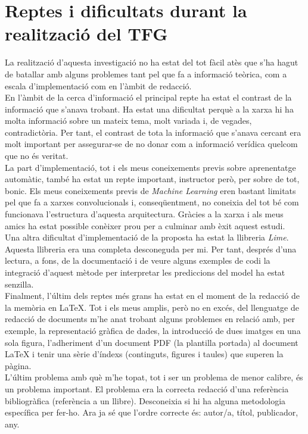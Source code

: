 \documentclass[a4paper,12pt]{report}
\begin{document}
\chapter*{Reptes i dificultats durant la realització del TFG}
La realització d'aquesta investigació no ha estat del tot fàcil atès que s'ha hagut de batallar amb alguns problemes tant pel que fa a informació teòrica, com a escala d'implementació com en l'àmbit de redacció.\\
En l'àmbit de la cerca d'informació el principal repte ha estat el contrast de la informació que s'anava trobant. Ha estat una dificultat perquè a la xarxa hi ha molta informació sobre un mateix tema, molt variada i, de vegades, contradictòria. Per tant, el contrast de tota la informació que s'anava cercant era molt important per assegurar-se de no donar com a informació verídica quelcom que no és veritat.\\
La part d'implementació, tot i els meus coneixements previs sobre aprenentatge automàtic, també ha estat un repte important, instructor però, per sobre de tot, bonic. Els meus coneixements previs de \textit{Machine Learning} eren bastant limitats pel que fa a xarxes convolucionals i, conseqüentment, no coneixia del tot bé com funcionava l'estructura d'aquesta arquitectura. Gràcies a la xarxa i als meus amics ha estat possible conèixer prou per a culminar amb èxit aquest estudi.\\
Una altra dificultat d'implementació de la proposta ha estat la llibreria \textit{Lime}. Aquesta llibreria era una completa desconeguda per mi. Per tant, després d'una lectura, a fons, de la documentació i de veure alguns exemples de codi la integració d'aquest mètode per interpretar les prediccions del model ha estat senzilla.\\
Finalment, l'últim dels reptes més grans ha estat en el moment de la redacció de la memòria en LaTeX. Tot i els meus amplis, però no en excés, del llenguatge de redacció de documents m'he anat trobant alguns problemes en relació amb, per exemple, la representació gràfica de dades, la introducció de dues imatges en una sola figura, l'adheriment d'un document PDF (la plantilla portada) al document LaTeX i tenir una sèrie d'índexs (continguts, figures i taules) que superen la pàgina.\\
L'últim problema amb què m'he topat, tot i ser un problema de menor calibre, és un problema important. El problema era la correcta redacció d'una referència bibliogràfica (referència a un llibre). Desconeixia si hi ha alguna metodologia específica per fer-ho. Ara ja sé que l'ordre correcte és: autor/a, títol, publicador, any.
\end{document}

